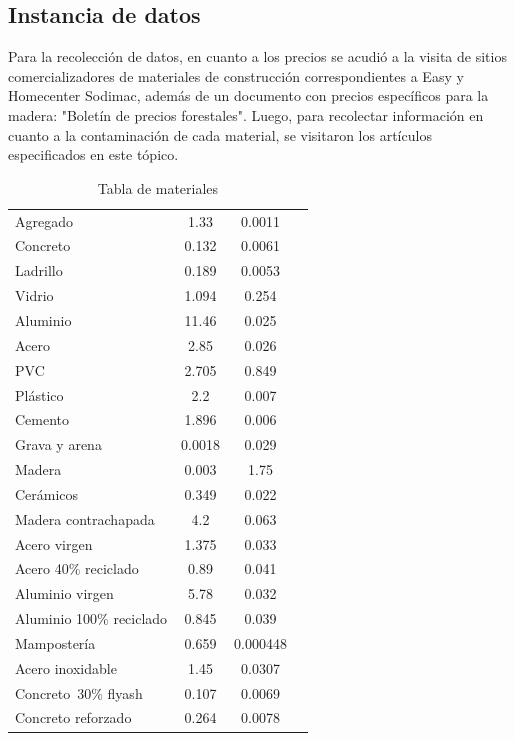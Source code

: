 \documentclass[letterpaper]{article}
\begin{document}
\subsection{Instancia de datos}
Para la recolección de datos, en cuanto a los precios se acudió a la visita de sitios comercializadores de materiales de construcción correspondientes a Easy y Homecenter Sodimac, además de un documento con precios específicos para la madera:
 "Boletín de precios forestales". Luego, para recolectar información en cuanto a la contaminación de cada material, se visitaron los artículos especificados en este tópico.


\begin{table}[ht]
	\centering
	\caption{Tabla de materiales}
	\begin{tabular}[t]{lccc}
	\toprule
	\text{Material}&\text{Contaminación (Kg CO2/Kg)}& \text{Precio (UF)}&\\
	\midrule
	Agregado& 1.33& 0.0011\\
	Concreto&0.132& 0.0061\\
	Ladrillo &0.189& 0.0053\\
	Vidrio& 1.094& 0.254\\
	Aluminio& 11.46& 0.025\\
	Acero& 2.85& 0.026\\
	PVC& 2.705& 0.849\\
	Plástico&2.2& 0.007\\
	Cemento& 1.896& 0.006\\
	Grava y arena& 0.0018& 0.029\\
	Madera& 0.003& 1.75\\
	Cerámicos&0.349& 0.022\\
	Madera contrachapada &4.2& 0.063 \\
	Acero virgen & 1.375 & 0.033 \\
	Acero 40\% reciclado & 0.89 & 0.041 \\
	Aluminio virgen &5.78 & 0.032 \\
	Aluminio 100\% reciclado & 0.845 & 0.039 \\
	Mampostería & 0.659 &0.000448 \\
	Acero inoxidable& 1.45 & 0.0307\\
	Concreto\ 30\% flyash & 0.107 & 0.0069 \\
	Concreto reforzado & 0.264 & 0.0078 \\
	\bottomrule
	\end{tabular}
\end{table}
	
\end{document}
